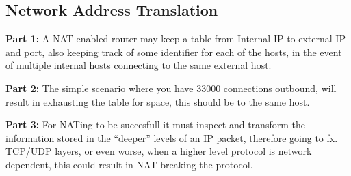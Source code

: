 \subsection{Network Address Translation}
\textbf{Part 1: } A NAT-enabled router may keep a table from Internal-IP to
external-IP and port, also keeping track of some identifier for each of the
hosts, in the event of multiple internal hosts connecting to the same external
host.

\textbf{Part 2: } The simple scenario where you have 33000 connections
outbound, will result in exhausting the table for space, this should be to the
same host.

\textbf{Part 3: } For NATing to be succesfull it must inspect and transform the
information stored in the ``deeper'' levels of an IP packet, therefore going to
fx. TCP/UDP layers, or even worse, when a higher level protocol is network
dependent, this could result in NAT breaking the protocol.

